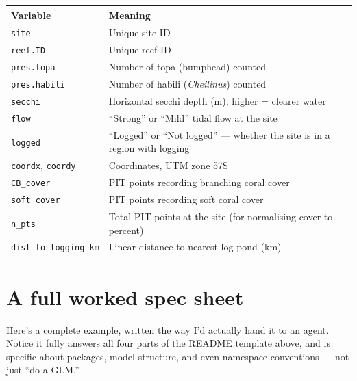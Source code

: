 \documentclass[
  letterpaper,
  DIV=11,
  numbers=noendperiod]{scrreprt}
\begin{document}
\begin{longtable}[]{@{}
  >{\raggedright\arraybackslash}p{}
  >{\raggedright\arraybackslash}p{}@{}}
\toprule\noalign{}
\begin{minipage}[b]{\linewidth}\raggedright
Variable
\end{minipage} & \begin{minipage}[b]{\linewidth}\raggedright
Meaning
\end{minipage} \\
\midrule\noalign{}
\endhead
\bottomrule\noalign{}
\endlastfoot
\texttt{site} & Unique site ID \\
\texttt{reef.ID} & Unique reef ID \\
\texttt{pres.topa} & Number of topa (bumphead) counted \\
\texttt{pres.habili} & Number of habili (\emph{Cheilinus}) counted \\
\texttt{secchi} & Horizontal secchi depth (m); higher = clearer water \\
\texttt{flow} & ``Strong'' or ``Mild'' tidal flow at the site \\
\texttt{logged} & ``Logged'' or ``Not logged'' --- whether the site is
in a region with logging \\
\texttt{coordx}, \texttt{coordy} & Coordinates, UTM zone 57S \\
\texttt{CB\_cover} & PIT points recording branching coral cover \\
\texttt{soft\_cover} & PIT points recording soft coral cover \\
\texttt{n\_pts} & Total PIT points at the site (for normalising cover to
percent) \\
\texttt{dist\_to\_logging\_km} & Linear distance to nearest log pond
(km) \\
\end{longtable}

\section{A full worked spec sheet}\label{a-full-worked-spec-sheet}

Here's a complete example, written the way I'd actually hand it to an
agent. Notice it fully answers all four parts of the README template
above, and is specific about packages, model structure, and even
namespace conventions --- not just ``do a GLM.''
\end{document}
